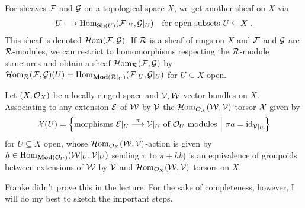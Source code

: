\documentclass[a4paper,parskip=half,numbers=enddot, DIV=12]{scrreprt}
\begin{document}
For sheaves $\mathcal{F}$ and $\mathcal{G}$ on a topological space $X$, we get another sheaf on $X$ via 
\begin{align*}
	U\longmapsto \Hom_{\cat{Sh}(U)}(\Ff|_U,\Gg|_U)\quad\text{for open subsets }U\subseteq X\;.
\end{align*}
This sheaf is denoted $\operatorname{\mathcal{H} om}(\mathcal{F},\mathcal{G})$. If $\mathcal{R}$ is  a sheaf of rings on $X$ and $\mathcal{F}$ and $\mathcal{G}$ are $\mathcal{R}$-modules, we can restrict to homomorphisms respecting the $\mathcal{R}$-module structures and obtain a sheaf $\operatorname{\mathcal{H} om}_{\mathcal{R}}(\mathcal{F},\mathcal{G})$ by $\Hhom_{\Rr}(\Ff,\Gg)(U)=\Hom_{\cat{Mod}(\Rr|_U)}(\Ff|_U,\Gg|_U)$ for $U\subseteq X$ open.
\begin{prop}
	Let $(X,\mathcal{O}_X)$ be a locally ringed space and $\mathcal{V},\mathcal{W}$ vector bundles on $X$. Associating to any extension $\mathcal{E}$ of $\mathcal{W}$ by $\mathcal{V}$ the $\operatorname{\mathcal{H} om}_{\mathcal{O}_X}(\mathcal{W},\mathcal{V})$-torsor $\mathcal{X}$ given by
	\begin{align*}
		\Xx(U)=\left\{\text{morphisms }\Ee|_U\morphism[\pi]\Vv|_U\text{ of }\Oo_U\text{-modules}\st \pi a=\id_{\Vv|_U}\right\}
	\end{align*}
	for $U\subseteq X$ open, whose $\operatorname{\mathcal{H} om}_{\mathcal{O}_X}(\mathcal{W},\mathcal{V})$-action is given by $h\in\Hom_{\cat{Mod}(\Oo_U)}(\Ww|_U,\Vv|_U)$ sending $\pi$ to $\pi+h b$) is an equivalence of groupoids between extensions of $\mathcal{W}$ by $\mathcal{V}$ and $\operatorname{\mathcal{H} om}_{\mathcal{O}_X}(\mathcal{W},\mathcal{V})$-torsors on $X$.
\end{prop}
Franke didn't prove this in the lecture. For the sake of completeness, however, I will do my best to sketch the important steps.
\end{document}
